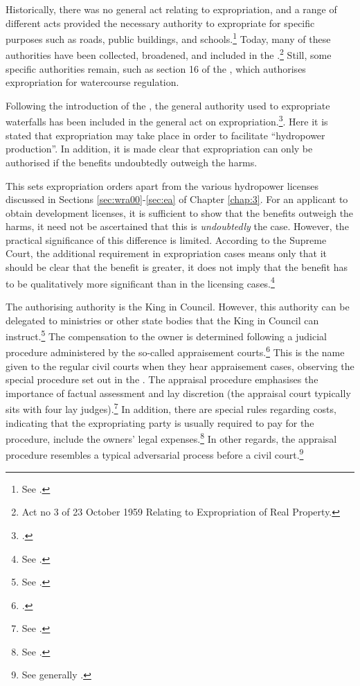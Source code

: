 Historically, there was no general act relating to expropriation, and a range of different acts provided the necessary authority to expropriate for specific purposes such as roads, public buildings, and schools.\footnote{See \cite[11-12]{nut54}.} Today, many of these authorities have been collected, broadened, and included in the \cite{ea59}.\footnote{Act no 3 of 23 October 1959 Relating to Expropriation of Real Property.} Still, some specific authorities remain, such as section 16 of the \cite{wra17}, which authorises expropriation for watercourse regulation.

Following the introduction of the \cite{wra00}, the general authority used to expropriate waterfalls has been included in the general act on expropriation.\footcite[2 no 51]{ea59}. Here it is stated that expropriation may take place in order to facilitate ``hydropower production''. In addition, it is made clear that expropriation can only be authorised if the benefits undoubtedly outweigh the harms. 

This sets expropriation orders apart from the various hydropower licenses discussed in Sections \ref{sec:wra00}-\ref{sec:ea} of Chapter \ref{chap:3}. For an applicant to obtain development licenses, it is sufficient to show that the benefits outweigh the harms, it need not be ascertained that this is {\it undoubtedly} the case. However, the practical significance of this difference is limited. According to the Supreme Court, the additional requirement in expropriation cases means only that it should be clear that the benefit is greater, it does not imply that the benefit has to be qualitatively more significant than in the licensing cases.\footnote{See \cite{lovenskiold09}.}

The authorising authority is the King in Council. However, this authority can be delegated to ministries or other state bodies that the King in Council can instruct.\footnote{See \cite[5]{ea59}.} The compensation to the owner is determined following a judicial procedure administered by the so-called appraisement courts.\footnote{\cite[2]{ea59}.} This is the name given to the regular civil courts when they hear appraisement cases, observing the special procedure set out in the \cite{aa17}. The appraisal procedure emphasises the importance of factual assessment and lay discretion (the appraisal court typically sits with four lay judges).\footnote{See \cite[11-12]{aa17}.} In addition, there are special rules regarding costs, indicating that the expropriating party is usually required to pay for the procedure, include the owners' legal expenses.\footnote{See \cite[54]{aa17}.} In other regards, the appraisal procedure resembles a typical adversarial process before a civil court.\footnote{See generally \cite{dyrkolbotn15}.} 


